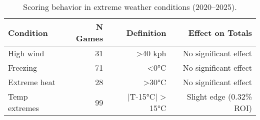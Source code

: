 \begin{table}[t]
  \centering
  \small
  \caption[Extreme weather conditions]{Scoring behavior in extreme weather conditions (2020--2025).}
  \label{tab:extreme-weather}
  \setlength{\tabcolsep}{4pt}\renewcommand{\arraystretch}{1.12}
  \begin{tabular}{@{} l r r r @{} }
    \toprule
    \textbf{Condition} & \textbf{N Games} & \textbf{Definition} & \textbf{Effect on Totals} \\
    \midrule
    High wind & 31 & >40 kph & No significant effect \\
    Freezing & 71 & <0°C & No significant effect \\
    Extreme heat & 28 & >30°C & No significant effect \\
    Temp extremes & 99 & |T-15°C| > 15°C & Slight edge (0.32\% ROI) \\
    \bottomrule
  \end{tabular}
\end{table}
